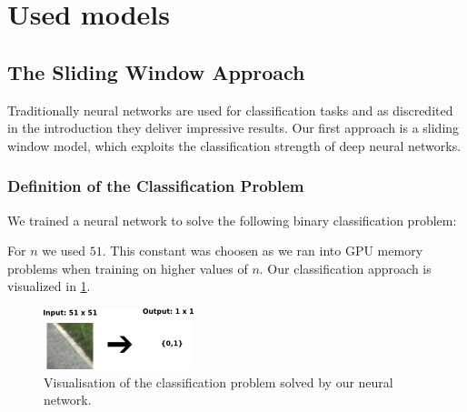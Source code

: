 
\section{Used models}\label{sec:model}

\subsection{The Sliding Window Approach}

Traditionally neural networks are used for classification tasks and as discredited in the introduction they deliver impressive results. Our first approach is a sliding window model, which exploits the classification strength of deep neural networks.

\subsubsection{Definition of the Classification Problem}

We trained a neural network to solve the following binary classification problem:


For $n$ we used $51$. This constant was choosen as we ran into GPU memory problems when training on higher values of $n$. Our classification approach is visualized in \cref{fig:figure}.

\begin{figure}[H]
	\centering
	\includegraphics[width=0.5\columnwidth]{figures/models/sliding_window.png}
	\caption{Visualisation of the classification problem solved by our neural network.}
	\label{fig:figure}
\end{figure}


